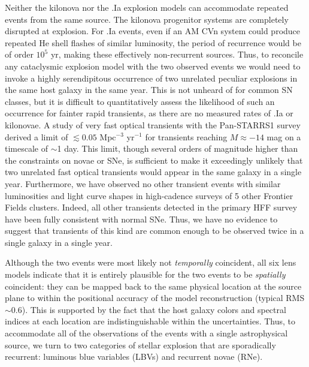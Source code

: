 Neither the kilonova nor the .Ia explosion models can accommodate
repeated events from the same source. The kilonova progenitor systems
are completely disrupted at explosion.  For .Ia events, even if an AM
CVn system could produce repeated He shell flashes of similar
luminosity, the period of recurrence would be of order $10^5$ yr,
making these effectively non-recurrent sources.  Thus, to reconcile
any cataclysmic explosion model with the two observed \spock events we
would need to invoke a highly serendipitous occurrence of two
unrelated peculiar explosions in the same host galaxy in the same
year. This is not unheard of for common SN classes\cite{Poznanski:2009}, but it is difficult to quantitatively
assess the likelihood of such an occurrence for fainter rapid
transients, as there are no measured rates of .Ia or kilonovae.  A
study of very fast optical transients with the Pan-STARRS1 survey derived a limit of $\lesssim0.05$ Mpc$^{-3}$
yr$^{-1}$ for transients reaching $M\approx -14$ mag on a timescale of
$\sim$1 day\citet{Berger:2013b}.  This limit, though several orders of magnitude higher
than the constraints on novae or SNe, is sufficient to make it
exceedingly unlikely that two unrelated fast optical transients would
appear in the same galaxy in a single year.  Furthermore, we have
observed no other transient events with similar luminosities and light
curve shapes in high-cadence surveys of 5 other Frontier Fields
clusters. Indeed, all other transients detected in the primary HFF
survey have been fully consistent with normal SNe.  Thus, we have no
evidence to suggest that transients of this kind are common enough to
be observed twice in a single galaxy in a single year.



Although the two events were most likely not {\it temporally}
coincident, all six lens models indicate that it is entirely plausible
for the two \spock events to be {\it spatially} coincident: they can
be mapped back to the same physical location at the source plane to
within the positional accuracy of the model reconstruction (typical
RMS$\sim$0.6\arcsec). This is supported by the fact that the host
galaxy colors and spectral indices at each \spock location are
indistinguishable within the uncertainties.  Thus, to accommodate all
of the observations of the \spock events with a single astrophysical
source, we turn to two categories of stellar explosion that are
sporadically recurrent: luminous blue variables (LBVs) and recurrent
novae (RNe).

